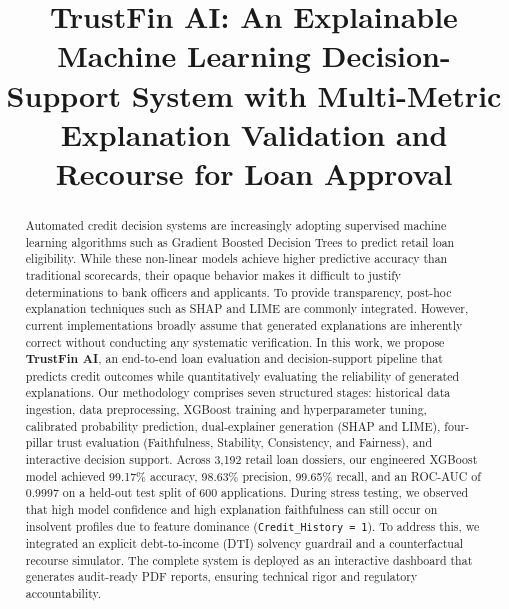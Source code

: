 \documentclass[conference]{IEEEtran}
\begin{document}
\title{TrustFin AI: An Explainable Machine Learning Decision-Support System with Multi-Metric Explanation Validation and Recourse for Loan Approval}

\author{
}

\maketitle

\begin{abstract}
Automated credit decision systems are increasingly adopting supervised machine learning algorithms such as Gradient Boosted Decision Trees to predict retail loan eligibility. While these non-linear models achieve higher predictive accuracy than traditional scorecards, their opaque behavior makes it difficult to justify determinations to bank officers and applicants. To provide transparency, post-hoc explanation techniques such as SHAP and LIME are commonly integrated. However, current implementations broadly assume that generated explanations are inherently correct without conducting any systematic verification. In this work, we propose \textbf{TrustFin AI}, an end-to-end loan evaluation and decision-support pipeline that predicts credit outcomes while quantitatively evaluating the reliability of generated explanations. Our methodology comprises seven structured stages: historical data ingestion, data preprocessing, XGBoost training and hyperparameter tuning, calibrated probability prediction, dual-explainer generation (SHAP and LIME), four-pillar trust evaluation (Faithfulness, Stability, Consistency, and Fairness), and interactive decision support. Across 3,192 retail loan dossiers, our engineered XGBoost model achieved 99.17\% accuracy, 98.63\% precision, 99.65\% recall, and an ROC-AUC of 0.9997 on a held-out test split of 600 applications. During stress testing, we observed that high model confidence and high explanation faithfulness can still occur on insolvent profiles due to feature dominance (\texttt{Credit\_History = 1}). To address this, we integrated an explicit debt-to-income (DTI) solvency guardrail and a counterfactual recourse simulator. The complete system is deployed as an interactive dashboard that generates audit-ready PDF reports, ensuring technical rigor and regulatory accountability.
\end{abstract}
\end{document}
